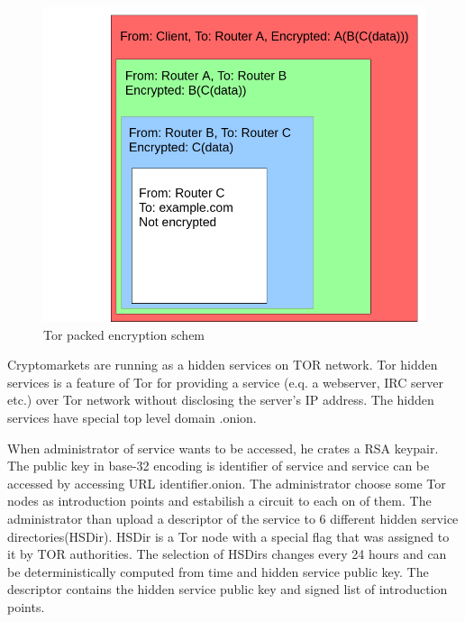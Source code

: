\documentclass[
  digital, %
  table,   %
  lof,     %
  lot,     %
  oneside
]{fithesis3}
\begin{document}
\begin{figure}[!htb]
    \centering
    \includegraphics[width=1\textwidth]{tor-packet}
    \caption{Tor packed encryption schem}
    \label{Tor packed encryption schema}
\end{figure}
 
Cryptomarkets are running as a hidden services on TOR network.
Tor hidden services is a feature of Tor for providing a service (e.q. a webserver, IRC server etc.) over Tor network
without disclosing the server's IP address. The hidden services have special top level domain .onion.

When administrator of service wants to be accessed, he crates a RSA keypair.
The public key in base-32 encoding is identifier of service and service can be accessed by accessing URL identifier.onion.
The administrator choose some Tor nodes as introduction points and estabilish a circuit to each on of them.
The administrator than upload a descriptor of the service to 6 different hidden service directories(HSDir).
HSDir is a Tor node with a special flag that was assigned to it by TOR authorities.
The selection of HSDirs changes every 24 hours and can be deterministically computed from time and hidden service public key.
The descriptor contains the hidden service public key and signed list of introduction points.
\end{document}
